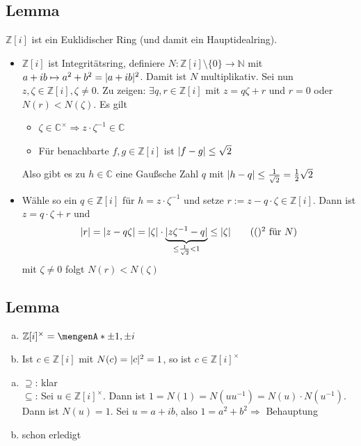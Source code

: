 \subsection[Lemma: Der Ring der Gaußschen Zahlen ist ein Hauptidealring]{Lemma} %
\label{sub:919}
$\mathds{Z}[i]$ ist ein Euklidischer Ring (und damit ein Hauptidealring).
\begin{itemize}
	\item $\mathds{Z}[i]$ ist Integritätsring, definiere $N : \mathds{Z}[i] \setminus \{0\} \to \mathds{N}$ mit $a+ ib \mapsto a^2 + b^2 = \lvert a+ ib\rvert^2 $. Damit ist $N$
	multiplikativ. Sei nun $z, \zeta \in \mathds{Z}[i], \zeta \not= 0$. Zu zeigen: $\exists q,r \in \mathds{Z}[i]$ mit $z= q \zeta +r$ und $r=0$ oder 
	$N(r) < N(\zeta)$. Es gilt \begin{itemize}
		\item $\zeta \in \mathds{C}^\times \Rightarrow z \cdot \zeta ^{-1} \in \mathds{C}$
		\item Für benachbarte $f,g \in \mathds{Z}[i]$ ist $\lvert f-g\rvert \le \sqrt{2}$
	\end{itemize}
	Also gibt es zu $h \in \mathds{C}$ eine Gaußsche Zahl $q$ mit $\lvert h-q\rvert \le \frac{1}{\sqrt{2}} = \frac{1}{2} \sqrt{2}     $
	\item Wähle so ein $q \in \mathds{Z}[i]$ für $h = z \cdot \zeta ^{-1}$ und setze $r := z - q \cdot \zeta \in \mathds{Z}[i]$. Dann ist $z= q \cdot \zeta +r$ und 
	\[
		\lvert r\rvert = \lvert z- q \zeta\rvert = \lvert\zeta\rvert \cdot \underbrace{\lvert z \zeta ^{-1} - q\rvert}_{\le \frac{1}{\sqrt{2}} < 1} \le \lvert\zeta\rvert \tag{$()^2$ für $N$}
	\]
	mit $\zeta \not= 0 $ folgt $ N(r) < N(\zeta)$ \bewende
\end{itemize}

\subsection[Lemma: Einheiten in den Gaußschen Zahlen]{Lemma} %
\label{sub:920}
\begin{enumerate}[a)]
	\item $\mathds{Z}[i]^\times = \set{\pm 1, \pm i} $
	\item Ist $c \in \mathds{Z}[i]$ mit $N(c)= \lvert c\rvert^2 = 1 $, so ist $c \in \mathds{Z}[i]^\times$
\end{enumerate}
\begin{enumerate}[a)]
	\item \glqq$\supseteq$\grqq: klar \\
	\glqq$\subseteq$\grqq: Sei $u \in \mathds{Z}[i]^\times$. Dann ist $1=N(1)= N(u u ^{-1}) = N(u) \cdot N(u ^{-1})$. Dann ist $N(u) = 1$. Sei $u= a+ ib$, also 
	$1= a^2 + b^2 \Rightarrow $ Behauptung
	\item schon erledigt \bewende
\end{enumerate}

